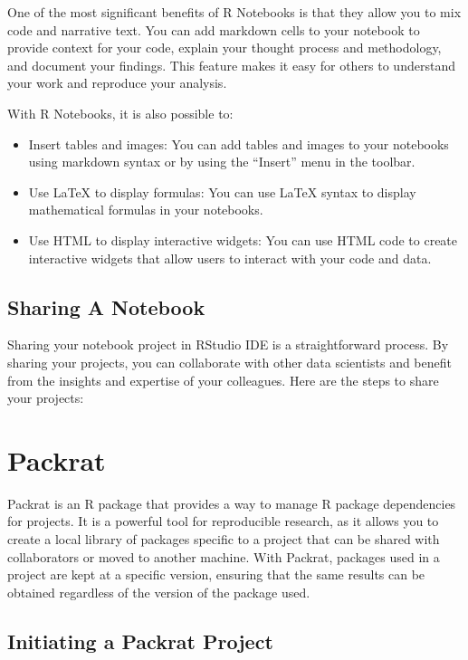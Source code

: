 \documentclass[
]{book}
\providecommand{\tightlist}{%
  \setlength{\itemsep}{0pt}\setlength{\parskip}{0pt}}
\begin{document}
One of the most significant benefits of R Notebooks is that they allow you to mix code and narrative text. You can add markdown cells to your notebook to provide context for your code, explain your thought process and methodology, and document your findings. This feature makes it easy for others to understand your work and reproduce your analysis.

With R Notebooks, it is also possible to:

\begin{itemize}
\tightlist
\item
  Insert tables and images: You can add tables and images to your notebooks using markdown syntax or by using the ``Insert'' menu in the toolbar.
\item
  Use LaTeX to display formulas: You can use LaTeX syntax to display mathematical formulas in your notebooks.
\item
  Use HTML to display interactive widgets: You can use HTML code to create interactive widgets that allow users to interact with your code and data.
\end{itemize}

\hypertarget{sharing-a-notebook}{%
\subsection*{Sharing A Notebook}\label{sharing-a-notebook}}

Sharing your notebook project in RStudio IDE is a straightforward process. By sharing your projects, you can collaborate with other data scientists and benefit from the insights and expertise of your colleagues. Here are the steps to share your projects:

\hypertarget{packrat}{%
\section{Packrat}\label{packrat}}

Packrat is an R package that provides a way to manage R package dependencies for projects. It is a powerful tool for reproducible research, as it allows you to create a local library of packages specific to a project that can be shared with collaborators or moved to another machine. With Packrat, packages used in a project are kept at a specific version, ensuring that the same results can be obtained regardless of the version of the package used.

\hypertarget{initiating-a-packrat-project}{%
\subsection*{Initiating a Packrat Project}\label{initiating-a-packrat-project}}
\end{document}
